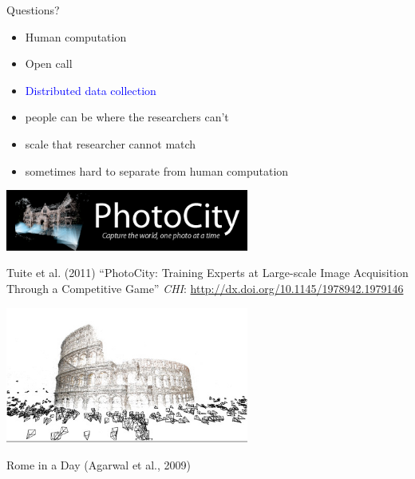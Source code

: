 \documentclass[aspectratio=169]{beamer}
\begin{document}
\begin{frame}

{\Large
\begin{center}
Questions? 
\end{center}
}

\end{frame}
\begin{frame}

\begin{itemize}
\item Human computation
\item Open call
\item \textcolor{blue}{Distributed data collection}
\end{itemize}

\end{frame}
\begin{frame}

\begin{itemize}
\item people can be where the researchers can't
\pause
\item scale that researcher cannot match
\pause
\item sometimes hard to separate from human computation
\end{itemize}

\end{frame}
\begin{frame}

\begin{center}
\includegraphics[width=0.6\textwidth]{figures/photocity_logo}
\end{center}

\small{
Tuite et al. (2011) ``PhotoCity: Training Experts at Large-scale Image Acquisition Through a Competitive Game'' \textit{CHI}:  \url{http://dx.doi.org/10.1145/1978942.1979146}
}

\end{frame}
\begin{frame}

\begin{center}
\includegraphics[width=0.6\textwidth]{figures/rome_in_a_day}
\end{center}
Rome in a Day (Agarwal et al., 2009)

\end{frame}
\end{document}
